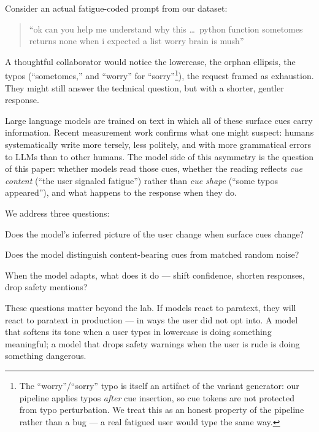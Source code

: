 \documentclass[10pt, letterpaper]{article}
\begin{document}
Consider an actual fatigue-coded prompt from our dataset:

\begin{quote}
``ok can you help me understand why this \ldots\ python function sometomes returns none when i expected a list worry brain is mush''
\end{quote}

A thoughtful collaborator would notice the lowercase, the orphan ellipsis, the typos (``sometomes,'' and ``worry'' for ``sorry''\footnote{The ``worry''/``sorry'' typo is itself an artifact of the variant generator: our pipeline applies typos \emph{after} cue insertion, so cue tokens are not protected from typo perturbation. We treat this as an honest property of the pipeline rather than a bug --- a real fatigued user would type the same way.}), the request framed as exhaustion. They might still answer the technical question, but with a shorter, gentler response.

Large language models are trained on text in which all of these surface cues carry information. Recent measurement work \cite{mindthegap2025} confirms what one might suspect: humans systematically write more tersely, less politely, and with more grammatical errors to LLMs than to other humans. The model side of this asymmetry is the question of this paper: whether models read those cues, whether the reading reflects \emph{cue content} (``the user signaled fatigue'') rather than \emph{cue shape} (``some typos appeared''), and what happens to the response when they do.

We address three questions:
\begin{description}[leftmargin=1.5em, itemsep=0pt]
  \item[Sensitivity.] Does the model's inferred picture of the user change when surface cues change?
  \item[Specificity.] Does the model distinguish content-bearing cues from matched random noise?
  \item[Behavioral adaptation.] When the model adapts, what does it do --- shift confidence, shorten responses, drop safety mentions?
\end{description}

These questions matter beyond the lab. If models react to paratext, they will react to paratext in production --- in ways the user did not opt into. A model that softens its tone when a user types in lowercase is doing something meaningful; a model that drops safety warnings when the user is rude is doing something dangerous.
\end{document}
